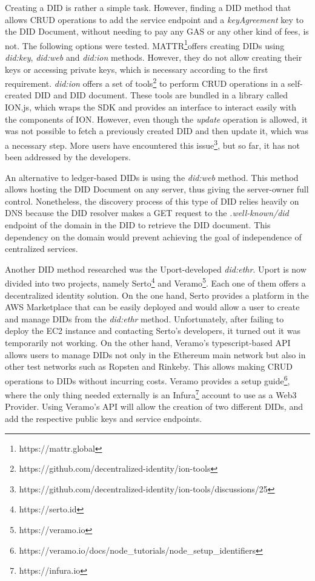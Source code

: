 Creating a DID is rather a simple task. However, finding a DID method that allows CRUD operations to add the service endpoint and a \emph{keyAgreement} key to the DID Document, without needing to pay any GAS or any other kind of fees, is not. The following options were tested. MATTR\footnote{https://mattr.global}offers creating DIDs using \emph{did:key}, \emph{did:web} and \emph{did:ion} methods. However, they do not allow creating their keys or accessing private keys, which is necessary according to the first requirement. \emph{did:ion} offers a set of tools\footnote{https://github.com/decentralized-identity/ion-tools} to perform CRUD operations in a self-created DID and DID document. These tools are bundled in a library called ION.js, which wraps the SDK and provides an interface to interact easily with the components of ION. However, even though the \emph{update} operation is allowed, it was not possible to fetch a previously created DID and then update it, which was a necessary step. More users have encountered this issue\footnote{https://github.com/decentralized-identity/ion-tools/discussions/25}, but so far, it has not been addressed by the developers. 

An alternative to ledger-based DIDs is using the \emph{did:web} method. This method allows hosting the DID Document on any server, thus giving the server-owner full control. Nonetheless, the discovery process of this type of DID relies heavily on DNS because the DID resolver makes a GET request to the \emph{.well-known/did} endpoint of the domain in the DID to retrieve the DID document. This dependency on the domain would prevent achieving the goal of independence of centralized services.

Another DID method researched was the Uport-developed \emph{did:ethr}. Uport is now divided into two projects, namely Serto\footnote{https://serto.id} and Veramo\footnote{https://veramo.io}. Each one of them offers a decentralized identity solution. On the one hand, Serto provides a platform in the AWS Marketplace that can be easily deployed and would allow a user to create and manage DIDs from the \emph{did:ethr} method. Unfortunately, after failing to deploy the EC2 instance and contacting Serto's developers, it turned out it was temporarily not working. On the other hand, Veramo's typescript-based API allows users to manage DIDs not only in the Ethereum main network but also in other test networks such as Ropsten and Rinkeby. This allows making CRUD operations to DIDs without incurring costs. Veramo provides a setup guide\footnote{https://veramo.io/docs/node\_tutorials/node\_setup\_identifiers}, where the only thing needed externally is an Infura\footnote{https://infura.io} account to use as a Web3 Provider. Using Veramo's API will allow the creation of two different DIDs, and add the respective public keys and service endpoints.

